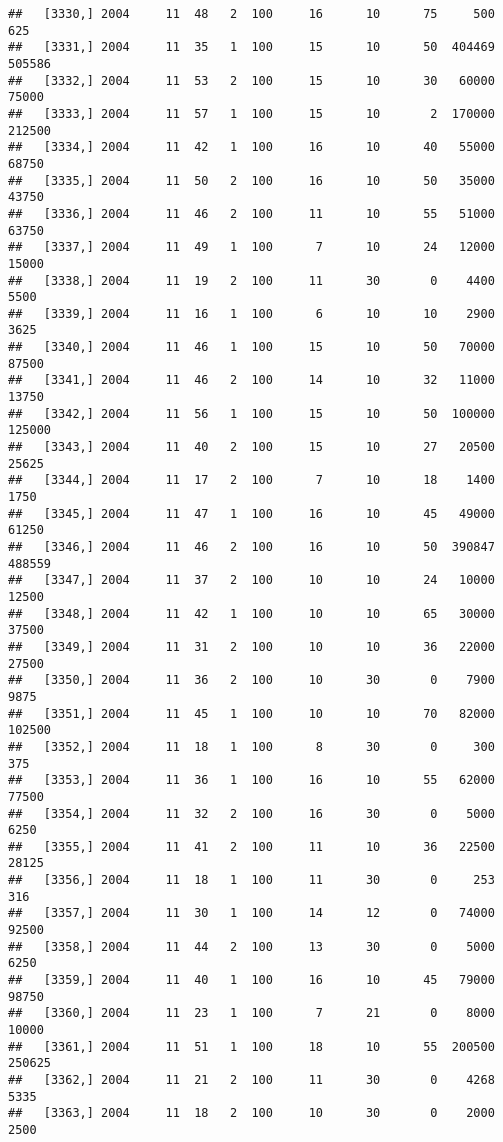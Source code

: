 \documentclass{article}\usepackage[]{graphicx}\usepackage[]{color}
\makeatletter
\newenvironment{kframe}{%
 \def\at@end@of@kframe{}%
 \ifinner\ifhmode%
  \def\at@end@of@kframe{\end{minipage}}%
  \begin{minipage}{\columnwidth}%
 \fi\fi%
 \def\FrameCommand##1{\hskip\@totalleftmargin \hskip-\fboxsep
 \colorbox{shadecolor}{##1}\hskip-\fboxsep
     \hskip-\linewidth \hskip-\@totalleftmargin \hskip\columnwidth}%
 \MakeFramed {\advance\hsize-\width
   \@totalleftmargin\z@ \linewidth\hsize
   \@setminipage}}%
 {\par\unskip\endMakeFramed%
 \at@end@of@kframe}
\newenvironment{knitrout}{}{} %
\makeatother
\begin{document}
\begin{knitrout}
\begin{kframe}
\begin{verbatim}
##   [3330,] 2004     11  48   2  100     16      10      75     500     625
##   [3331,] 2004     11  35   1  100     15      10      50  404469  505586
##   [3332,] 2004     11  53   2  100     15      10      30   60000   75000
##   [3333,] 2004     11  57   1  100     15      10       2  170000  212500
##   [3334,] 2004     11  42   1  100     16      10      40   55000   68750
##   [3335,] 2004     11  50   2  100     16      10      50   35000   43750
##   [3336,] 2004     11  46   2  100     11      10      55   51000   63750
##   [3337,] 2004     11  49   1  100      7      10      24   12000   15000
##   [3338,] 2004     11  19   2  100     11      30       0    4400    5500
##   [3339,] 2004     11  16   1  100      6      10      10    2900    3625
##   [3340,] 2004     11  46   1  100     15      10      50   70000   87500
##   [3341,] 2004     11  46   2  100     14      10      32   11000   13750
##   [3342,] 2004     11  56   1  100     15      10      50  100000  125000
##   [3343,] 2004     11  40   2  100     15      10      27   20500   25625
##   [3344,] 2004     11  17   2  100      7      10      18    1400    1750
##   [3345,] 2004     11  47   1  100     16      10      45   49000   61250
##   [3346,] 2004     11  46   2  100     16      10      50  390847  488559
##   [3347,] 2004     11  37   2  100     10      10      24   10000   12500
##   [3348,] 2004     11  42   1  100     10      10      65   30000   37500
##   [3349,] 2004     11  31   2  100     10      10      36   22000   27500
##   [3350,] 2004     11  36   2  100     10      30       0    7900    9875
##   [3351,] 2004     11  45   1  100     10      10      70   82000  102500
##   [3352,] 2004     11  18   1  100      8      30       0     300     375
##   [3353,] 2004     11  36   1  100     16      10      55   62000   77500
##   [3354,] 2004     11  32   2  100     16      30       0    5000    6250
##   [3355,] 2004     11  41   2  100     11      10      36   22500   28125
##   [3356,] 2004     11  18   1  100     11      30       0     253     316
##   [3357,] 2004     11  30   1  100     14      12       0   74000   92500
##   [3358,] 2004     11  44   2  100     13      30       0    5000    6250
##   [3359,] 2004     11  40   1  100     16      10      45   79000   98750
##   [3360,] 2004     11  23   1  100      7      21       0    8000   10000
##   [3361,] 2004     11  51   1  100     18      10      55  200500  250625
##   [3362,] 2004     11  21   2  100     11      30       0    4268    5335
##   [3363,] 2004     11  18   2  100     10      30       0    2000    2500

\end{verbatim}
\end{kframe}
\end{knitrout}
\end{document}
